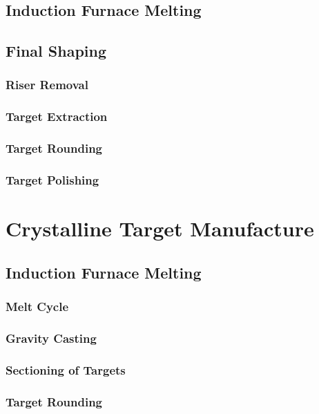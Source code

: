 \documentclass[a4paper,12pt,oneside]{report}%
\begin{document}
\subsection{Induction Furnace Melting}

\subsection{Final Shaping}

\subsubsection{Riser Removal} 

\subsubsection{Target Extraction}

\subsubsection{Target Rounding}

\subsubsection{Target Polishing}

\section{Crystalline Target Manufacture}

\subsection{Induction Furnace Melting}

\subsubsection{Melt Cycle}

\subsubsection{Gravity Casting}

\subsubsection{Sectioning of Targets}

\subsubsection{Target Rounding}
\end{document}
